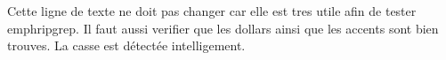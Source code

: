 \begin{exercise}[title=Ripgrep fails]
	Cette ligne de texte ne doit pas changer car elle est tres utile afin de
	tester emph{ripgrep}. Il faut aussi verifier que les dollars ainsi que les
	accents sont bien trouves. La casse est détectée intelligement.
\end{exercise}
